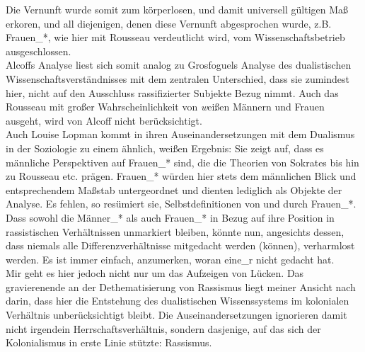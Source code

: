 Die Vernunft wurde somit zum körperlosen, und damit universell gültigen Maß
erkoren, und all diejenigen, denen diese Vernunft abgesprochen wurde, z.B.
Frauen\_*, wie hier mit Rousseau verdeutlicht wird, vom Wissenschaftsbetrieb
ausgeschlossen. \\
Alcoffs Analyse liest sich somit analog zu Grosfoguels Analyse
des dualistischen Wissenschaftsverständnisses mit dem zentralen Unterschied,
dass sie zumindest hier, nicht auf den Ausschluss rassifizierter Subjekte Bezug
nimmt. Auch das Rousseau mit großer Wahrscheinlichkeit von \textit{w}eißen Männern und
Frauen ausgeht, wird von Alcoff nicht berücksichtigt.\\ 

Auch Louise Lopman kommt in
ihren Auseinandersetzungen mit dem Dualismus in der Soziologie zu einem
ähnlich, weißen Ergebnis: Sie zeigt auf, dass es männliche Perspektiven auf
Frauen\_* sind, die die Theorien von Sokrates bis hin zu Rousseau etc. prägen.
Frauen\_* würden hier stets dem männlichen Blick und entsprechendem Maßstab
untergeordnet und dienten lediglich als Objekte der Analyse. Es fehlen, so
resümiert sie, Selbstdefinitionen von und durch Frauen\_*.\footnotemark
{} \\
Dass sowohl die
Männer\_* als auch Frauen\_* in Bezug auf ihre Position in rassistischen
Verhältnissen unmarkiert bleiben, könnte nun, angesichts dessen, dass niemals
alle Differenzverhältnisse mitgedacht werden (können), verharmlost werden. Es
ist immer einfach, anzumerken, woran eine\_r nicht gedacht hat.\\

\noindent Mir geht es hier jedoch nicht nur um das Aufzeigen von Lücken. Das gravierenende an
der Dethematisierung von Rassismus liegt meiner Ansicht nach darin, dass hier
die Entstehung des dualistischen Wissenssystems im kolonialen Verhältnis
unberücksichtigt bleibt. Die Auseinandersetzungen ignorieren damit nicht
irgendein Herrschaftsverhältnis, sondern dasjenige, auf das sich der
Kolonialismus in erste Linie stützte: Rassismus.\\

